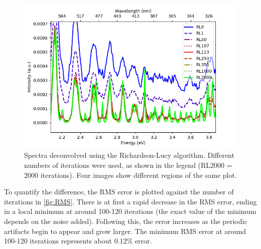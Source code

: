 \documentclass[12pt, titlepage]{article}
\begin{document}
\begin{figure}[h]
    \includegraphics[scale=0.4]{Deconvolved_spectra_SimNoise3-4.png}
    \caption{Spectra deconvolved using the Richardson-Lucy algorithm. Different
        numbers of iterations were used, as shown in the legend (RL2000 = 2000
        iterations). Four images show different regions of the same plot.
    \label{fig:DeconvSpec}}
\end{figure}

To quantify the difference, the RMS error is plotted against the number of
iterations in \ref{fig:RMS}. There is at first a rapid decrease in the RMS
error, ending in a local minimum at around 100-120 iterations (the exact value
of the minimum depends on the noise added). Following this, the error increases
as the periodic artifacts begin to appear and grow larger. The minimum RMS error
at around 100-120 iterations represents about 0.12\% error.
\end{document}
